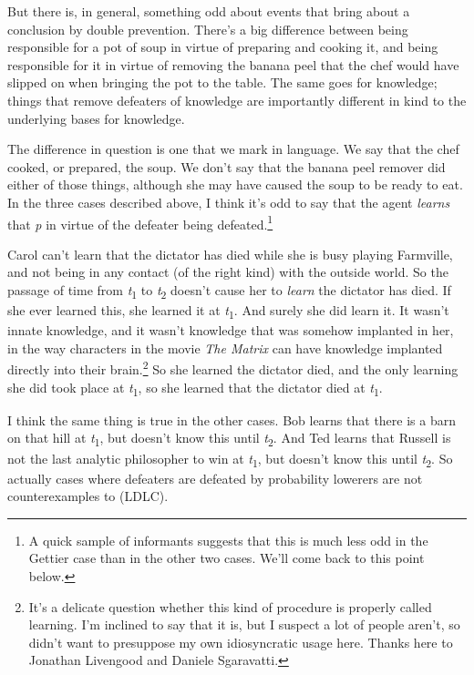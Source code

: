 \documentclass[
  11pt,
  letterpaper,
  DIV=11,
  numbers=noendperiod,
  twoside]{scrartcl}
\begin{document}
But there is, in general, something odd about events that bring about a
conclusion by double prevention. There's a big difference between being
responsible for a pot of soup in virtue of preparing and cooking it, and
being responsible for it in virtue of removing the banana peel that the
chef would have slipped on when bringing the pot to the table. The same
goes for knowledge; things that remove defeaters of knowledge are
importantly different in kind to the underlying bases for knowledge.

The difference in question is one that we mark in language. We say that
the chef cooked, or prepared, the soup. We don't say that the banana
peel remover did either of those things, although she may have caused
the soup to be ready to eat. In the three cases described above, I think
it's odd to say that the agent \emph{learns} that \emph{p} in virtue of
the defeater being defeated.\footnote{A quick sample of informants
  suggests that this is much less odd in the Gettier case than in the
  other two cases. We'll come back to this point below.}

Carol can't learn that the dictator has died while she is busy playing
Farmville, and not being in any contact (of the right kind) with the
outside world. So the passage of time from \emph{t}\textsubscript{1} to
\emph{t}\textsubscript{2} doesn't cause her to \emph{learn} the dictator
has died. If she ever learned this, she learned it at
\emph{t}\textsubscript{1}. And surely she did learn it. It wasn't innate
knowledge, and it wasn't knowledge that was somehow implanted in her, in
the way characters in the movie \emph{The Matrix} can have knowledge
implanted directly into their brain.\footnote{It's a delicate question
  whether this kind of procedure is properly called learning. I'm
  inclined to say that it is, but I suspect a lot of people aren't, so
  didn't want to presuppose my own idiosyncratic usage here. Thanks here
  to Jonathan Livengood and Daniele Sgaravatti.} So she learned the
dictator died, and the only learning she did took place at
\emph{t}\textsubscript{1}, so she learned that the dictator died at
\emph{t}\textsubscript{1}.

I think the same thing is true in the other cases. Bob learns that there
is a barn on that hill at \emph{t}\textsubscript{1}, but doesn't know
this until \emph{t}\textsubscript{2}. And Ted learns that Russell is not
the last analytic philosopher to win at \emph{t}\textsubscript{1}, but
doesn't know this until \emph{t}\textsubscript{2}. So actually cases
where defeaters are defeated by probability lowerers are not
counterexamples to (LDLC).
\end{document}
